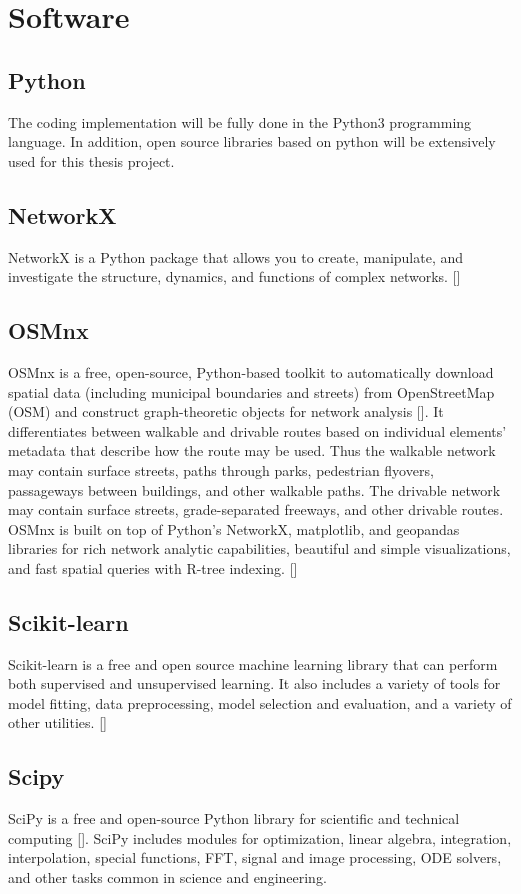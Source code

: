 \section{Software}
\subsection{Python}
The coding implementation will be fully done in the Python3 programming language. In addition, open source libraries based on python will be extensively used for this thesis project.

\subsection{NetworkX}
NetworkX is a Python package that allows you to create, manipulate, and investigate the structure, dynamics, and functions of complex networks. [\cite{Hagberg:2008}]

\subsection{OSMnx}
OSMnx is a free, open-source, Python-based toolkit to automatically download spatial data (including municipal boundaries and streets) from OpenStreetMap (OSM) and construct graph-theoretic objects for network analysis [\cite{Boeing:2017}]. It differentiates between walkable and drivable routes based on individual elements’ metadata that describe how the route may be used. Thus the walkable network may contain surface streets, paths through parks, pedestrian flyovers, passageways between buildings, and other walkable paths. The drivable network may contain surface streets, grade-separated freeways, and other drivable routes. OSMnx is built on top of Python's NetworkX, matplotlib, and geopandas libraries for rich network analytic capabilities, beautiful and simple visualizations, and fast spatial queries with R-tree indexing. [\cite{Boeing:2017}]

\subsection{Scikit-learn}
Scikit-learn is a free and open source machine learning library that can perform both supervised and unsupervised learning. It also includes a variety of tools for model fitting, data preprocessing, model selection and evaluation, and a variety of other utilities. [\cite{scikit-learn}]

\subsection{Scipy}
SciPy is a free and open-source Python library for scientific and technical computing [\cite{Virtanen:2020}]. SciPy includes modules for optimization, linear algebra, integration, interpolation, special functions, FFT, signal and image processing, ODE solvers, and other tasks common in science and engineering.

